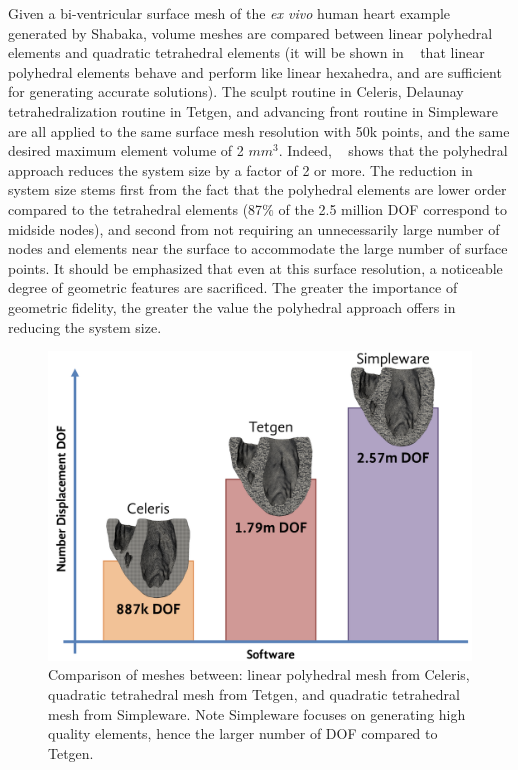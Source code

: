 Given a bi-ventricular surface mesh of the \textit{ex vivo} human heart example generated by Shabaka, volume meshes are compared between linear polyhedral elements and quadratic tetrahedral elements (it will be shown in ~ that linear polyhedral elements behave and perform like linear hexahedra, and are sufficient for generating accurate solutions). The sculpt routine in Celeris, Delaunay tetrahedralization routine in Tetgen, and advancing front routine in Simpleware are all applied to the same surface mesh resolution with 50k points, and the same desired maximum element volume of 2 $mm^3$. Indeed, ~ shows that the polyhedral approach reduces the system size by a factor of 2 or more. The reduction in system size stems first from the fact that the polyhedral elements are lower order compared to the tetrahedral elements (87$\%$ of the 2.5 million DOF correspond to midside nodes), and second from not requiring an unnecessarily large number of nodes and elements near the surface to accommodate the large number of surface points. It should be emphasized that even at this surface resolution, a noticeable degree of geometric features are sacrificed. The greater the importance of geometric fidelity, the greater the value the polyhedral approach offers in reducing the system size.

\begin{figure}[ht!]
\centering
		\includegraphics[scale=0.2]{media/comparison.png}
%
\caption{Comparison of meshes between: linear polyhedral mesh from Celeris, quadratic tetrahedral mesh from Tetgen, and quadratic tetrahedral mesh from Simpleware. Note Simpleware focuses on generating high quality elements, hence the larger number of DOF compared to Tetgen.}
\label{fig:compdof}
\end{figure}

